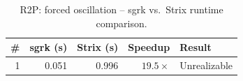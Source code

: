 \begin{table}[htbp]
\centering
\caption{R2P: forced oscillation -- sgrk vs.\ Strix runtime comparison.}
\label{tab:R2P_forced_oscillation}
\begin{tabular}{r r r r l}
\toprule
\# & sgrk (s) & Strix (s) & Speedup & Result \\
\midrule
1 & 0.051 & 0.996 & $19.5\times$ & Unrealizable \\
\bottomrule
\end{tabular}
\end{table}
